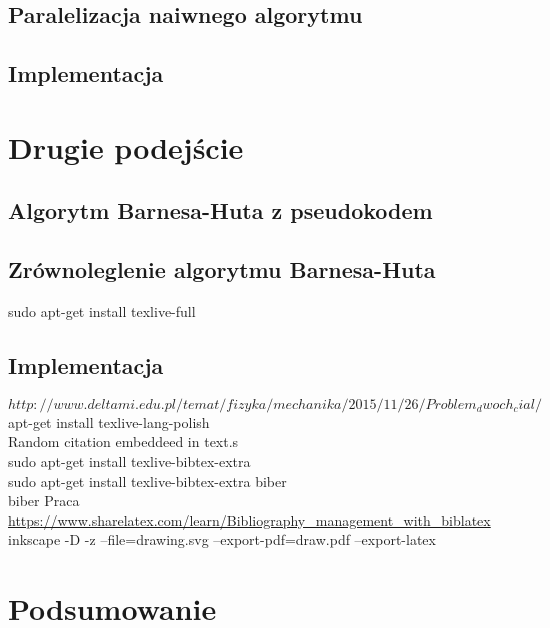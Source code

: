 \documentclass[14pt,twoside,a4paper]{article}
\begin{document}
\subsection{\Large Paralelizacja naiwnego algorytmu}

\bigskip
\subsection{\Large Implementacja}

\bigskip

\section{\LARGE Drugie podejście}

\bigskip

\subsection{\Large Algorytm Barnesa-Huta z pseudokodem}

\bigskip

\subsection{\Large Zrównoleglenie algorytmu Barnesa-Huta}

\bigskip
 sudo apt-get install texlive-full

\subsection{\Large Implementacja}

$http://www.deltami.edu.pl/temat/fizyka/mechanika/2015/11/26/Problem_dwoch_cial/$
\bigskip
apt-get install texlive-lang-polish\\
Random citation embeddeed in text.s\\
 sudo apt-get install texlive-bibtex-extra\\
 sudo apt-get install texlive-bibtex-extra biber\\
biber Praca\\
\url{https://www.sharelatex.com/learn/Bibliography_management_with_biblatex}\\
inkscape -D -z --file=drawing.svg --export-pdf=draw.pdf --export-latex


\section{\LARGE Podsumowanie}

\newpage

\nocite{*}
\printbibliography
\end{document}
